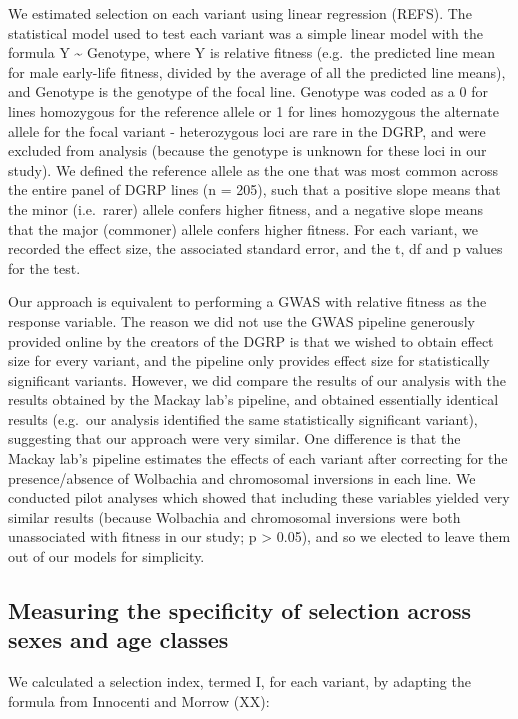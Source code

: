\documentclass{article}
\begin{document}
We estimated selection on each variant using linear regression (REFS).
The statistical model used to test each variant was a simple linear
model with the formula Y \textasciitilde{} Genotype, where Y is relative
fitness (e.g.~the predicted line mean for male early-life fitness,
divided by the average of all the predicted line means), and Genotype is
the genotype of the focal line. Genotype was coded as a 0 for lines
homozygous for the reference allele or 1 for lines homozygous the
alternate allele for the focal variant - heterozygous loci are rare in
the DGRP, and were excluded from analysis (because the genotype is
unknown for these loci in our study). We defined the reference allele as
the one that was most common across the entire panel of DGRP lines (n =
205), such that a positive slope means that the minor (i.e.~rarer)
allele confers higher fitness, and a negative slope means that the major
(commoner) allele confers higher fitness. For each variant, we recorded
the effect size, the associated standard error, and the t, df and p
values for the test.

Our approach is equivalent to performing a GWAS with relative fitness as
the response variable. The reason we did not use the GWAS pipeline
generously provided online by the creators of the DGRP is that we wished
to obtain effect size for every variant, and the pipeline only provides
effect size for statistically significant variants. However, we did
compare the results of our analysis with the results obtained by the
Mackay lab's pipeline, and obtained essentially identical results
(e.g.~our analysis identified the same statistically significant
variant), suggesting that our approach were very similar. One difference
is that the Mackay lab's pipeline estimates the effects of each variant
after correcting for the presence/absence of Wolbachia and chromosomal
inversions in each line. We conducted pilot analyses which showed that
including these variables yielded very similar results (because
Wolbachia and chromosomal inversions were both unassociated with fitness
in our study; p \textgreater{} 0.05), and so we elected to leave them
out of our models for simplicity.

\subsection*{Measuring the specificity of selection across sexes and age classes}

We calculated a selection index, termed I, for each variant, by adapting
the formula from Innocenti and Morrow (XX):
\end{document}
